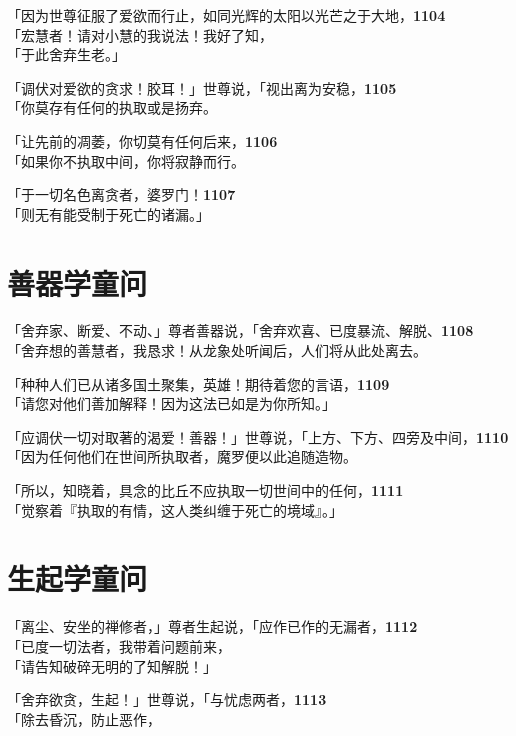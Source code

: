 「因为世尊征服了爱欲而行止，如同光辉的太阳以光芒之于大地，\hfill{\grayfootnotesize \textbf{1104}} \\
「宏慧者！请对小慧的我说法！我好了知，\\
「于此舍弃生老。」


「调伏对爱欲的贪求！胶耳！」世尊说，「视出离为安稳，\hfill{\grayfootnotesize \textbf{1105}} \\
「你莫存有任何的执取或是扬弃。


「让先前的凋萎，你切莫有任何后来，\hfill{\grayfootnotesize \textbf{1106}} \\
「如果你不执取中间，你将寂静而行。


「于一切名色离贪者，婆罗门！\hfill{\grayfootnotesize \textbf{1107}} \\
「则无有能受制于死亡的诸漏。」


\section{善器学童问}

「舍弃家、断爱、不动、」尊者善器说，「舍弃欢喜、已度暴流、解脱、\hfill{\grayfootnotesize \textbf{1108}} \\
「舍弃想的善慧者，我恳求！从龙象处听闻后，人们将从此处离去。


「种种人们已从诸多国土聚集，英雄！期待着您的言语，\hfill{\grayfootnotesize \textbf{1109}} \\
「请您对他们善加解释！因为这法已如是为你所知。」


「应调伏一切对取著的渴爱！善器！」世尊说，「上方、下方、四旁及中间，\hfill{\grayfootnotesize \textbf{1110}} \\
「因为任何他们在世间所执取者，魔罗便以此追随造物。


「所以，知晓着，具念的比丘不应执取一切世间中的任何，\hfill{\grayfootnotesize \textbf{1111}} \\
「觉察着『执取的有情，这人类纠缠于死亡的境域』。」\\


\section{生起学童问}

「离尘、安坐的禅修者，」尊者生起说，「应作已作的无漏者，\hfill{\grayfootnotesize \textbf{1112}} \\
「已度一切法者，我带着问题前来，\\
「请告知破碎无明的了知解脱！」


「舍弃欲贪，生起！」世尊说，「与忧虑两者，\hfill{\grayfootnotesize \textbf{1113}} \\
「除去昏沉，防止恶作，


